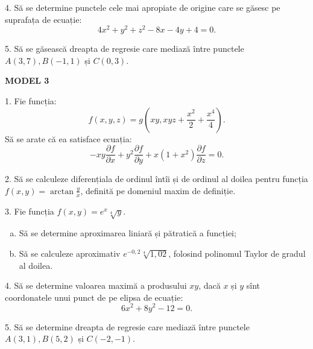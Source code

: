 \documentclass[11pt,a4paper]{article}
\theoremstyle{dotless}
\theoremstyle{dotlessdr}
\begin{document}
4. Să se determine punctele cele mai apropiate de origine care se găsesc pe
suprafața de ecuație:
\[
  4x^2 + y^2 + z^2 - 8x - 4y + 4 = 0.
\]

\vspace{1cm}

5. Să se găsească dreapta de regresie care mediază între punctele $A(3, 7), B(-1, 1)$ și
$C(0, 3)$.

\newpage

\textbf{MODEL 3}

1. Fie funcția:
\[
  f(x, y, z) = g(xy, xyz + \frac{x^2}{2} + \frac{x^4}{4}).
\]
Să se arate că ea satisface ecuația:
\[
  -xy \frac{\partial f}{\partial x} + y^2 \frac{\partial f}{\partial y} + %
  x(1 + x^2) \frac{\partial f}{\partial z} = 0.
\]

\vspace{1cm}

2. Să se calculeze diferențiala de ordinul întîi și de ordinul al doilea pentru
funcția $f(x, y) = \arctan \frac{y}{x}$, definită pe domeniul maxim de definiție.

\vspace{1cm}

3. Fie funcția $f(x, y) = e^x \sqrt[4]{y}$.
\begin{enumerate}[(a)]
\item Să se determine aproximarea liniară și pătratică a funcției;
\item Să se calculeze aproximativ $e^{-0,2}\sqrt[4]{1,02}$, folosind polinomul
  Taylor de gradul al doilea.
\end{enumerate}

\vspace{1cm}

4. Să se determine valoarea maximă a produsului $xy$, dacă $x$ și $y$ sînt coordonatele
unui punct de pe elipsa de ecuație:
\[
  6x^2 + 8y^2 - 12 = 0.
\]

\vspace{1cm}

5. Să se determine dreapta de regresie care mediază între punctele $A(3, 1), B(5, 2)$ și
$C(-2, -1)$.
\end{document}

